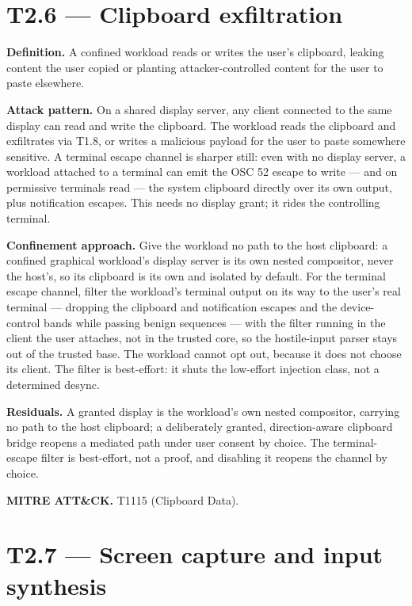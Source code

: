 \hypertarget{t2.6-clipboard-exfiltration}{%
\section{T2.6 --- Clipboard
exfiltration}\label{t2.6-clipboard-exfiltration}}

\textbf{Definition.} A confined workload reads or writes the user's
clipboard, leaking content the user copied or planting
attacker-controlled content for the user to paste elsewhere.

\textbf{Attack pattern.} On a shared display server, any client
connected to the same display can read and write the clipboard. The
workload reads the clipboard and exfiltrates via T1.8, or writes a
malicious payload for the user to paste somewhere sensitive. A terminal
escape channel is sharper still: even with no display server, a workload
attached to a terminal can emit the OSC 52 escape to write --- and on
permissive terminals read --- the system clipboard directly over its own
output, plus notification escapes. This needs no display grant; it rides
the controlling terminal.

\textbf{Confinement approach.} Give the workload no path to the host
clipboard: a confined graphical workload's display server is its own
nested compositor, never the host's, so its clipboard is its own and
isolated by default. For the terminal escape channel, filter the
workload's terminal output on its way to the user's real terminal ---
dropping the clipboard and notification escapes and the device-control
bands while passing benign sequences --- with the filter running in the
client the user attaches, not in the trusted core, so the hostile-input
parser stays out of the trusted base. The workload cannot opt out,
because it does not choose its client. The filter is best-effort: it
shuts the low-effort injection class, not a determined desync.

\textbf{Residuals.} A granted display is the workload's own nested
compositor, carrying no path to the host clipboard; a deliberately
granted, direction-aware clipboard bridge reopens a mediated path under
user consent by choice. The terminal-escape filter is best-effort, not a
proof, and disabling it reopens the channel by choice.

\textbf{MITRE ATT\&CK.} T1115 (Clipboard Data).

\hypertarget{t2.7-screen-capture-and-input-synthesis}{%
\section{T2.7 --- Screen capture and input
synthesis}\label{t2.7-screen-capture-and-input-synthesis}}

